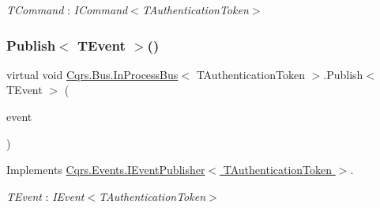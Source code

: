 \begin{Desc}
\item[Type Constraints]\begin{description}
\item[{\em T\+Command} : {\em I\+Command$<$T\+Authentication\+Token$>$}]\end{description}
\end{Desc}
\mbox{\label{classCqrs_1_1Bus_1_1InProcessBus_afd3d41a5f27a985e9d6ccf3f6f77f11a}} 
\subsubsection{\texorpdfstring{Publish$<$ T\+Event $>$()}{Publish< TEvent >()}\hspace{0.1cm}{\footnotesize\ttfamily [1/2]}}
{\footnotesize\ttfamily virtual void \hyperlink{classCqrs_1_1Bus_1_1InProcessBus}{Cqrs.\+Bus.\+In\+Process\+Bus}$<$ T\+Authentication\+Token $>$.Publish$<$ T\+Event $>$ (\begin{DoxyParamCaption}\item[{T\+Event @}]{event }\end{DoxyParamCaption})\hspace{0.3cm}{\ttfamily [virtual]}}



Implements \hyperlink{interfaceCqrs_1_1Events_1_1IEventPublisher_a02f0db0bc9b3aa1c7f766f58f8422ee3}{Cqrs.\+Events.\+I\+Event\+Publisher$<$ T\+Authentication\+Token $>$}.

\begin{Desc}
\item[Type Constraints]\begin{description}
\item[{\em T\+Event} : {\em I\+Event$<$T\+Authentication\+Token$>$}]\end{description}
\end{Desc}
\mbox{\label{classCqrs_1_1Bus_1_1InProcessBus_ae154f274db2a028a6094677d83cc1c74}} 
